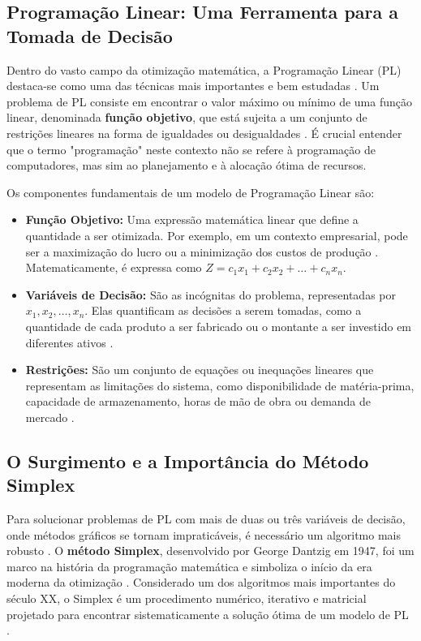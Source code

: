 \documentclass[conference]{IEEEtran}
\begin{document}
\subsection{Programação Linear: Uma Ferramenta para a Tomada de Decisão}
Dentro do vasto campo da otimização matemática, a Programação Linear (PL) destaca-se como uma das técnicas mais importantes e bem estudadas \cite{lima}. Um problema de PL consiste em encontrar o valor máximo ou mínimo de uma função linear, denominada \textbf{função objetivo}, que está sujeita a um conjunto de restrições lineares na forma de igualdades ou desigualdades \cite{lima}. É crucial entender que o termo "programação" neste contexto não se refere à programação de computadores, mas sim ao planejamento e à alocação ótima de recursos.

Os componentes fundamentais de um modelo de Programação Linear são:
\begin{itemize}
    \item \textbf{Função Objetivo:} Uma expressão matemática linear que define a quantidade a ser otimizada. Por exemplo, em um contexto empresarial, pode ser a maximização do lucro ou a minimização dos custos de produção \cite{menezes}. Matematicamente, é expressa como $Z = c_1x_1 + c_2x_2 + \dots + c_nx_n$.
    \item \textbf{Variáveis de Decisão:} São as incógnitas do problema, representadas por $x_1, x_2, \dots, x_n$. Elas quantificam as decisões a serem tomadas, como a quantidade de cada produto a ser fabricado ou o montante a ser investido em diferentes ativos \cite{menezes}.
    \item \textbf{Restrições:} São um conjunto de equações ou inequações lineares que representam as limitações do sistema, como disponibilidade de matéria-prima, capacidade de armazenamento, horas de mão de obra ou demanda de mercado \cite{menezes}.
\end{itemize}

\subsection{O Surgimento e a Importância do Método Simplex}
Para solucionar problemas de PL com mais de duas ou três variáveis de decisão, onde métodos gráficos se tornam impraticáveis, é necessário um algoritmo mais robusto \cite{barboza}. O \textbf{método Simplex}, desenvolvido por George Dantzig em 1947, foi um marco na história da programação matemática e simboliza o início da era moderna da otimização \cite{cordeiro}. Considerado um dos algoritmos mais importantes do século XX, o Simplex é um procedimento numérico, iterativo e matricial projetado para encontrar sistematicamente a solução ótima de um modelo de PL \cite{macambira}.
\end{document}
